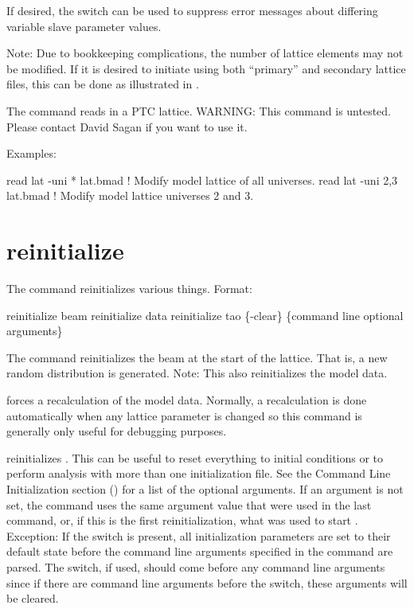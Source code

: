 If desired, the  switch can be used to suppress error messages about differing \tao
variable slave parameter values.

Note: Due to bookkeeping complications, the number of lattice elements may not be modified. If it is
desired to initiate \tao using both ``primary'' and secondary lattice files, this can be done as
illustrated in .

The  command reads in a PTC lattice. WARNING: This command is untested. Please contact
David Sagan if you want to use it.

Examples:
\begin{example}
  read lat -uni * lat.bmad   ! Modify model lattice of all universes.
  read lat -uni 2,3 lat.bmad ! Modify model lattice universes 2 and 3.
\end{example}

\section{reinitialize}
\label{s:reinit}

The  command reinitializes various things. Format:
\begin{example}
  reinitialize beam
  reinitialize data
  reinitialize tao \{-clear\} \{command line optional arguments\}
\end{example}

\vskip 10pt 

The  command reinitializes the beam at the start of the lattice. That is, a
new random distribution is generated.  Note: This also reinitializes the model data.

 forces a recalculation of the model data.  Normally, a recalculation is done
automatically when any lattice parameter is changed so this command is generally only useful for
debugging purposes.

 reinitializes \tao. This can be useful to reset everything to initial
conditions or to perform analysis with more than one initialization file. See the Command Line
Initialization section () for a list of the optional arguments. If an argument
is not set, the  command uses the same argument value that were used in the last
 command, or, if this is the first reinitialization, what was used to start \tao.
Exception: If the  switch is present, all initialization parameters are set to their
default state before the command line arguments specified in the  command are
parsed. The  switch, if used, should come before any command line arguments since if
there are command line arguments before the  switch, these arguments will be cleared.

